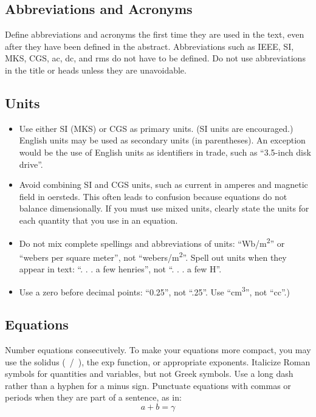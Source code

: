 \documentclass[conference]{IEEEtran}
\begin{document}
\subsection{Abbreviations and Acronyms}\label{AA}
Define abbreviations and acronyms the first time they are used in the text, 
even after they have been defined in the abstract. Abbreviations such as 
IEEE, SI, MKS, CGS, ac, dc, and rms do not have to be defined. Do not use 
abbreviations in the title or heads unless they are unavoidable.

\subsection{Units}
\begin{itemize}
\item Use either SI (MKS) or CGS as primary units. (SI units are encouraged.) English units may be used as secondary units (in parentheses). An exception would be the use of English units as identifiers in trade, such as ``3.5-inch disk drive''.
\item Avoid combining SI and CGS units, such as current in amperes and magnetic field in oersteds. This often leads to confusion because equations do not balance dimensionally. If you must use mixed units, clearly state the units for each quantity that you use in an equation.
\item Do not mix complete spellings and abbreviations of units: ``Wb/m\textsuperscript{2}'' or ``webers per square meter'', not ``webers/m\textsuperscript{2}''. Spell out units when they appear in text: ``. . . a few henries'', not ``. . . a few H''.
\item Use a zero before decimal points: ``0.25'', not ``.25''. Use ``cm\textsuperscript{3}'', not ``cc''.)
\end{itemize}

\subsection{Equations}
Number equations consecutively. To make your 
equations more compact, you may use the solidus (~/~), the exp function, or 
appropriate exponents. Italicize Roman symbols for quantities and variables, 
but not Greek symbols. Use a long dash rather than a hyphen for a minus 
sign. Punctuate equations with commas or periods when they are part of a 
sentence, as in:
\begin{equation}
a+b=\gamma\label{eq}
\end{equation}
\end{document}
